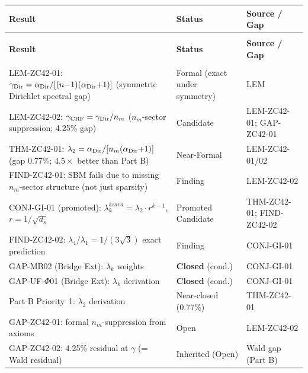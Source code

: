 \documentclass[12pt, a4paper]{article}
\providecommand{\ltwo}{\lambda_2}
\providecommand{\nm}{n_m}
\providecommand{\ds}{d_s}
\providecommand{\alphDir}{\alpha_{\rm Dir}}
\providecommand{\lkas}{\lambda_k^{\bar{\mathrm{a}}sava}}
\begin{document}
{\small
\setlength{\LTpre}{4pt}\setlength{\LTpost}{4pt}
\renewcommand{\arraystretch}{1.30}
\begin{longtable}{>{\raggedright\arraybackslash}p{5.5cm}
                  >{\centering\arraybackslash}p{2.8cm}
                  >{\raggedright\arraybackslash}p{4.0cm}}
\toprule
\textbf{Result} & \textbf{Status} & \textbf{Source / Gap} \\
\midrule
\endfirsthead
\multicolumn{3}{l}{\small\textit{(continued)}}\\[4pt]
\toprule
\textbf{Result} & \textbf{Status} & \textbf{Source / Gap} \\
\midrule
\endhead
\midrule
\multicolumn{3}{r}{\small\textit{(continues)}}\\
\endfoot
\bottomrule
\endlastfoot

LEM-ZC42-01: $\gamma_{\rm Dir} =
  \alphDir/[(n{-}1)(\alphDir{+}1)]$
  (symmetric Dirichlet spectral gap) &
  Formal (exact under symmetry) & LEM \\

LEM-ZC42-02: $\gamma_{\rm CRF} = \gamma_{\rm Dir}/\nm$
  ($\nm$-sector suppression; 4.25\% gap) &
  Candidate & LEM-ZC42-01; GAP-ZC42-01 \\

THM-ZC42-01: $\ltwo = \alphDir/[\nm(\alphDir{+}1)]$
  (gap 0.77\%; $4.5\times$ better than Part B) &
  Near-Formal & LEM-ZC42-01/02 \\

FIND-ZC42-01: SBM fails due to missing $\nm$-sector
  structure (not just sparsity) &
  Finding & LEM-ZC42-02 \\

CONJ-GI-01 (promoted): $\lkas = \ltwo\cdot r^{k-1}$,
  $r = 1/\sqrt{\ds}$ &
  Promoted Candidate & THM-ZC42-01; FIND-ZC42-02 \\

FIND-ZC42-02: $\lambda_4/\lambda_1 = 1/(3\sqrt{3})$
  exact prediction &
  Finding & CONJ-GI-01 \\

GAP-MB02 (Bridge Ext): $\lambda_k$ weights &
  \textbf{Closed} (cond.) & CONJ-GI-01 \\

GAP-UF-$\Phi$01 (Bridge Ext): $\lambda_k$ derivation &
  \textbf{Closed} (cond.) & CONJ-GI-01 \\

Part B Priority~1: $\lambda_2$ derivation &
  Near-closed (0.77\%) & THM-ZC42-01 \\

GAP-ZC42-01: formal $\nm$-suppression from axioms &
  Open & LEM-ZC42-02 \\

GAP-ZC42-02: 4.25\% residual at $\gamma$
  (= Wald residual) &
  Inherited (Open) & Wald gap (Part B) \\

\end{longtable}
}
\vspace{-\parskip}
\end{document}
